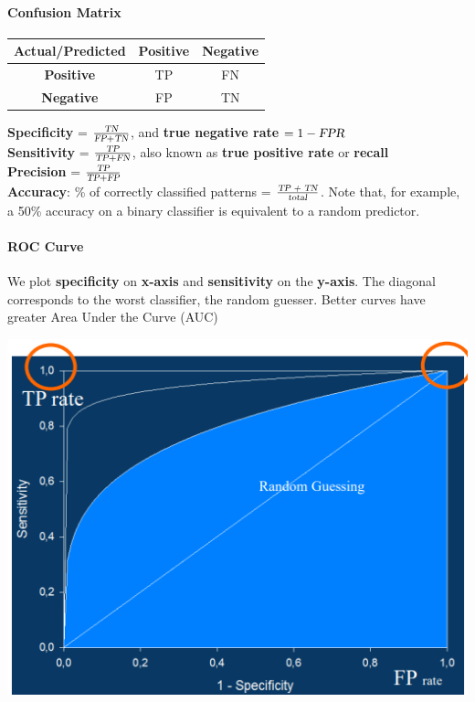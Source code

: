 \documentclass[10pt]{report}
\begin{document}
\paragraph{Confusion Matrix} \begin{center}
	\begin{tabular}{|c|c|c|}
		\hline
		Actual/Predicted & \textbf{Positive} & \textbf{Negative}\\
		\hline
		\textbf{Positive} & TP & FN\\
		\hline
		\textbf{Negative} & FP & TN\\
		\hline
	\end{tabular}
\end{center}
\textbf{Specificity} = $\frac{\textsl{TN}}{\textsl{FP} + \textsl{TN}}$, and \textbf{true negative rate} $= 1 - \textsl{FPR}$\\
\textbf{Sensitivity} = $\frac{\textsl{TP}}{\textsl{TP} + \textsl{FN}}$, also known as \textbf{true positive rate} or \textbf{recall}\\
\textbf{Precision} = $\frac{\textsl{TP}}{\textsl{TP} + \textsl{FP}}$\\
\textbf{Accuracy}: \% of correctly classified patterns = $\frac{\textsl{TP + TN}}{\textsl{total}}$. Note that, for example, a 50\% accuracy on a binary classifier is equivalent to a random predictor.
\paragraph{ROC Curve} We plot \textbf{specificity} on \textbf{x-axis} and \textbf{sensitivity} on the \textbf{y-axis}. The diagonal corresponds to the worst classifier, the random guesser. Better curves have greater Area Under the Curve (AUC)
\begin{center}
	\includegraphics[scale=0.5]{50.png}
\end{center}
\end{document}
